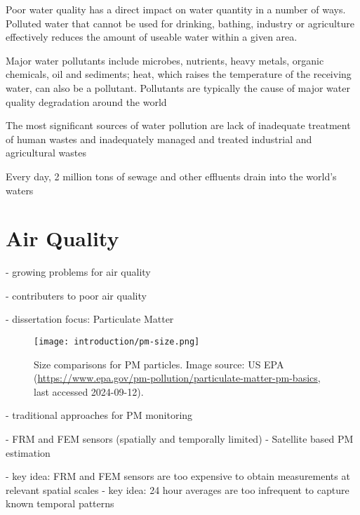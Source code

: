 Poor water quality has a direct impact on water quantity in a number of ways.
Polluted water that cannot be used for drinking, bathing, industry or
agriculture effectively reduces the amount of useable water within a given area.

Major water pollutants include microbes, nutrients, heavy metals, organic
chemicals, oil and sediments; heat, which raises the temperature of the
receiving water, can also be a pollutant. Pollutants are typically the cause of
major water quality degradation around the world

The most significant sources of water pollution are lack of inadequate treatment
of human wastes and inadequately managed and treated industrial and agricultural
wastes


Every day, 2 million tons of sewage and other effluents drain into the world's
waters


\section{Air Quality}

- growing problems for air quality

- contributers to poor air quality

- dissertation focus: Particulate Matter

\begin{figure}[h!]
  \centering
  \texttt{[image: introduction/pm-size.png]}
  \caption{Size comparisons for PM particles. Image source: US EPA
    (\url{https://www.epa.gov/pm-pollution/particulate-matter-pm-basics}, last
    accessed 2024-09-12).}
  \label{fig:pm-size-scale}
\end{figure}


- traditional approaches for PM monitoring

- FRM and FEM sensors (spatially and temporally limited)
- Satellite based PM estimation



- key idea: FRM and FEM sensors are too expensive to obtain measurements at
relevant spatial scales
- key idea: 24 hour averages are too infrequent to capture known temporal
patterns

